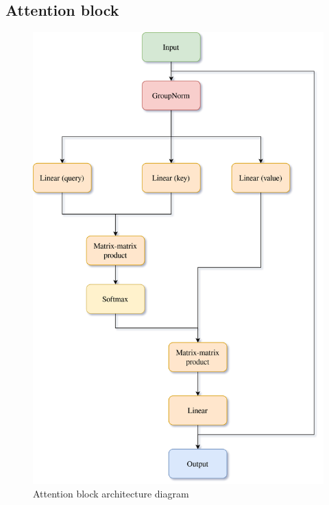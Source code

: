 \documentclass[11pt,a4paper]{report}
\begin{document}
\subsection{Attention block}
\begin{figure}[H]
	\centering
	\includegraphics[scale=0.2]{images/AttentionBlock.drawio}
    \caption{Attention block architecture diagram}
\end{figure}
\end{document}
